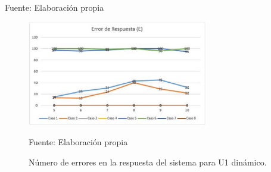 \begin{center}
\begin{table}[H]
\centering
\caption{\small{Resultados para el caso 6 con U1 dinámico.}}
\label{table:tabla4.23}
\begin{center}
\vskip 0.2cm
{\small{Fuente: Elaboración propia}}
\end{center}
\end{table}
\end{center}

\begin{figure}[H]
\begin{center}
\includegraphics[width=0.7\textwidth]{Imagenes/Cap4/image007}
\end{center}
\begin{center}
\vskip -0.5cm
\caption{\small{Número de errores en la respuesta del sistema para U1 dinámico.}}
\label{fig:figura4.7}
{\small{Fuente: Elaboración propia}}
\end{center}
\end{figure}

\vskip -0.5cm

